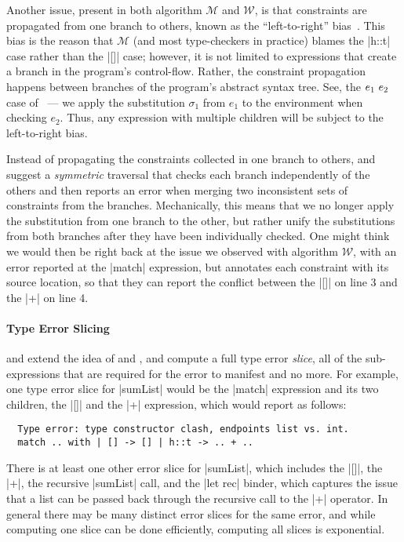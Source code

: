 Another issue, present in both algorithm $\mathcal{M}$ and
$\mathcal{W}$, is that constraints are propagated from one branch to
others, known as the ``left-to-right'' bias~\citep{McAdam1998-ub}.
%
This bias is the reason that $\mathcal{M}$ (and most type-checkers in
practice) blames the |h::t| case rather than the |[]| case; however,
it is not limited to expressions that create a branch in the program's
control-flow.
%
Rather, the constraint propagation happens between branches of the
program's abstract syntax tree.
%
See, \eg the $e_1\ e_2$ case of \W\ --- we apply the substitution
$\sigma_1$ from $e_1$ to the environment when checking $e_2$.
%
Thus, any expression with multiple children will be subject to the
left-to-right bias.

Instead of propagating the constraints collected in one branch to
others, \citet{McAdam1998-ub} and \citet{Yang1999-yr} suggest a
\emph{symmetric} traversal that checks each branch independently of the
others and then reports an error when merging two inconsistent sets of
constraints from the branches.
%
Mechanically, this means that we no longer apply the substitution from
one branch to the other, but rather unify the substitutions from both
branches after they have been individually checked.
%
One might think we would then be right back at the issue we observed
with algorithm $\mathcal{W}$, with an error reported at the |match|
expression, but \citeauthor{Yang1999-yr} annotates each constraint with
its source location, so that they can report the conflict between the
|[]| on line 3 and the |+| on line 4.

\paragraph{Type Error Slicing}
\citet{Tip2001-qp} and \citet{Haack2003-vc} extend the idea of
\citeauthor{McAdam1998-ub} and \citeauthor{Yang1999-yr}, and compute a
full type error \emph{slice}, \ie all of the sub-expressions that are
required for the error to manifest and no more.
%
For example, one type error slice for |sumList| would be the |match|
expression and its two children, the |[]| and the |+| expression,
which \cite{Haack2003-vc} would report as follows:
%
\begin{verbatim}
  Type error: type constructor clash, endpoints list vs. int.
  match .. with | [] -> [] | h::t -> .. + ..
\end{verbatim}
%
There is at least one other error slice for |sumList|, which includes
the |[]|, the |+|, the recursive |sumList| call, and the |let rec|
binder, which captures the issue that a list can be passed back through
the recursive call to the |+| operator.
%
In general there may be many distinct error slices for the same error,
and while computing one slice can be done efficiently,
computing all slices is exponential.

